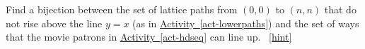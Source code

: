 \documentclass{book}
\begin{document}
\setcounter{project}{178}
\addtocounter{project}{-1}
\begin{activity}[]\label{act-pathshdseq}
\hypertarget{p-1060}{}%
Find a bijection between the set of lattice paths from \((0,0)\) to \((n,n)\) that do not rise above the line \(y = x\) (as in \hyperref[act-lowerpaths]{Activity~\ref{act-lowerpaths}}) and the set of ways that the movie patrons in \hyperref[act-hdseq]{Activity~\ref{act-hdseq}} can line up.%
~\hfill{\tiny\hyperlink{a-178}{[hint]}\hypertarget{q-178}{}}\end{activity}
\end{document}
